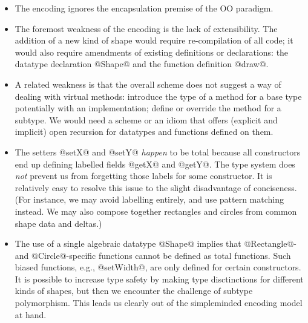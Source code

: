 \documentclass{jfp}
\begin{document}
\mbox{}

\begin{itemize}

\item
The encoding ignores the encapsulation premise of the OO paradigm.

\smallskip

\item
The foremost weakness of the encoding is the lack of extensibility.
The addition of a new kind of shape would require re-compilation of
all code; it would also require amendments of existing definitions or
declarations: the datatype declaration @Shape@ and the function
definition @draw@.

\smallskip

\item
A related weakness is that the overall scheme does not suggest a way
of dealing with virtual methods: introduce the type of a method for a
base type potentially with an implementation; define or override the
method for a subtype. We would need a scheme or an idiom that offers
(explicit and implicit) open recursion for datatypes and functions
defined on them.

\smallskip

\item
The setters @setX@ and @setY@ \emph{happen} to be total because all
constructors end up defining labelled fields @getX@ and @getY@. The
type system does \emph{not} prevent us from forgetting those labels
for some constructor. It is relatively easy to resolve this issue to
the slight disadvantage of conciseness. (For instance, we may
avoid labelling entirely, and use pattern matching instead. We may
also compose together rectangles and circles from common shape data
and deltas.)

\smallskip

\item
The use of a single algebraic datatype @Shape@ implies that
@Rectangle@- and @Circle@-specific functions cannot be defined as
total functions. Such biased functions, e.g., @setWidth@, are only
defined for certain constructors. It is possible to increase type
safety by making type disctinctions for different kinds of shapes, but
then we encounter the challenge of subtype polymorphism. This leads
us clearly out of the simpleminded encoding model at hand.

\end{itemize}



\end{document}
